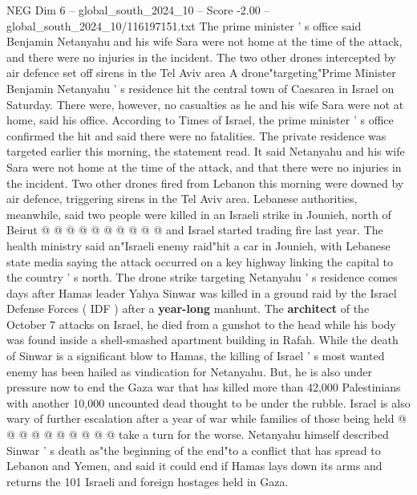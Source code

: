 \begin{textsample}{NEG Dim 6 – global\_south\_2024\_10 – Score -2.00 – global\_south\_2024\_10/116197151.txt}  \label{ex:f6_neg_026}
The prime minister ' s office said Benjamin Netanyahu and his wife Sara were not home at the time of the attack, and there were no injuries in the incident.
The two other drones intercepted by air defence set off sirens in the Tel Aviv area A drone"targeting"Prime Minister Benjamin Netanyahu ' s residence hit the central town of Caesarea in Israel on Saturday.
There were, however, no casualties as he and his wife Sara were not at home, said his office.
According to Times of Israel, the prime minister ' s office confirmed the hit and said there were no fatalities.
The private residence was targeted earlier this morning, the statement read.
It said Netanyahu and his wife Sara were not home at the time of the attack, and that there were no injuries in the incident.
Two other drones fired from Lebanon this morning were downed by air defence, triggering sirens in the Tel Aviv area.
Lebanese authorities, meanwhile, said two people were killed in an Israeli strike in Jounieh, north of Beirut @ @ @ @ @ @ @ @ @ @ and Israel started trading fire last year.
The health ministry said an"Israeli enemy raid"hit a car in Jounieh, with Lebanese state media saying the attack occurred on a key highway linking the capital to the country ' s north.
The drone strike targeting Netanyahu ' s residence comes days after Hamas leader Yahya Sinwar was killed in a ground raid by the Israel Defense Forces ( IDF ) after a \textbf{year-long} manhunt.
The \textbf{architect} of the October 7 attacks on Israel, he died from a gunshot to the head while his body was found inside a shell-smashed apartment building in Rafah.
While the death of Sinwar is a significant blow to Hamas, the killing of Israel ' s most wanted enemy has been hailed as vindication for Netanyahu.
But, he is also under pressure now to end the Gaza war that has killed more than 42,000 Palestinians with another 10,000 uncounted dead thought to be under the rubble.
Israel is also wary of further escalation after a year of war while families of those being held @ @ @ @ @ @ @ @ @ @ take a turn for the worse.
Netanyahu himself described Sinwar ' s death as"the beginning of the end"to a conflict that has spread to Lebanon and Yemen, and said it could end if Hamas lays down its arms and returns the 101 Israeli and foreign hostages held in Gaza.

\end{textsample}
